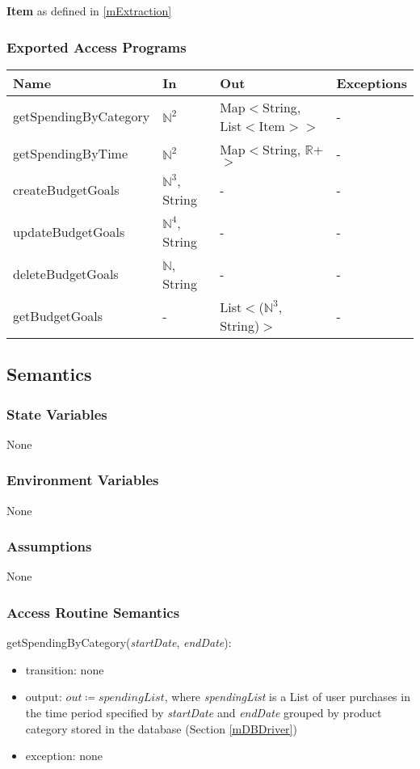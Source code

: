 \documentclass[12pt, titlepage]{article}
\begin{document}
\textbf{Item} as defined in \ref{mExtraction}

\subsubsection{Exported Access Programs}

\begin{center}

\begin{tabular}{p{5cm} p{3cm} p{4cm} p{4cm}}
\hline
\textbf{Name} & \textbf{In} & \textbf{Out} & \textbf{Exceptions} \\
\hline
getSpendingByCategory & $\mathbb{N}^2$ & Map$<$String, List$<$Item$>$$>$  & - \\
getSpendingByTime & $\mathbb{N}^2$ & Map$<$String, $\mathbb{R}$+$>$ & - \\
createBudgetGoals & $\mathbb{N}^3$, String & - & - \\
updateBudgetGoals & $\mathbb{N}^4$, String & - & - \\
deleteBudgetGoals & $\mathbb{N}$, String & - & - \\
getBudgetGoals & - & List$<$($\mathbb{N}^3$, String)$>$ & - \\
\hline
\end{tabular}
\end{center}

\subsection{Semantics}

\subsubsection{State Variables}
None

\subsubsection{Environment Variables}
None

\subsubsection{Assumptions}
None

\subsubsection{Access Routine Semantics}

\noindent getSpendingByCategory(\textit{startDate}, \textit{endDate}):
\begin{itemize}
\item transition: none
\item output: \( \textit{out} \coloneqq spendingList \), where \textit{spendingList} is a List of user purchases in the time period specified by \textit{startDate} and \textit{endDate} grouped by product category stored in the database (Section \ref{mDBDriver})
\item exception: none
\end{itemize}
\end{document}

